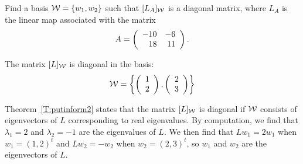 \documentclass{ximera}
\begin{document}
\begin{computerExercise} \label{c7.3.4}
Find a basis ${\cal W}=\{w_1,w_2\}$ such that $[L_A]_{\cal W}$ is
a diagonal matrix, where $L_A$ is the linear map associated with the
matrix
\[
A = \left(\begin{array}{rr} -10 & -6\\ 18 &11\end{array}\right).
\]

\begin{solution}

\ans The matrix $[L]_{\cal W}$ is diagonal in the basis:
\[
{\cal W} = \left\{\left(\begin{array}{r} 1 \\ 2\end{array}\right),\left(\begin{array}{r} 2 \\ 3\end{array}\right)\right\}
\]

\soln Theorem~\ref{T:putinform2} states
that the matrix $[L]_{\cal W}$ is diagonal if ${\cal W}$ consists of
eigenvectors of $L$ corresponding to real eigenvalues.  By
computation, we find that $\lambda_1 = 2$ and $\lambda_2 = -1$ are
the eigenvalues of $L$.  We then find that $Lw_1 = 2w_1$ when
$w_1 = (1,2)^t$ and $Lw_2 = -w_2$ when $w_2 = (2,3)^t$, so $w_1$ and
$w_2$ are the eigenvectors of $L$.

\end{solution}
\end{computerExercise}
\end{document}
